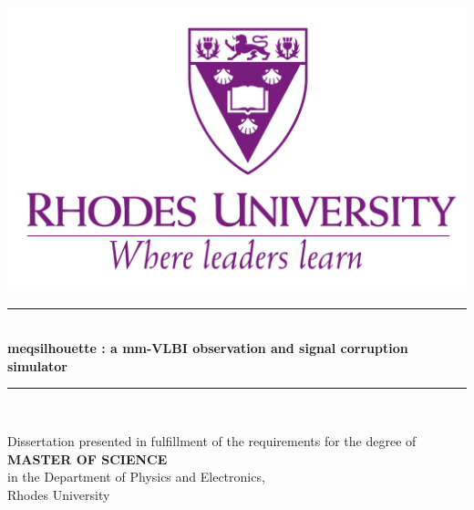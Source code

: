 \begin{titlepage}

\newcommand{\HRule}{\rule{\linewidth}{0.5mm}} %

\center %
 

\includegraphics[width=0.4\columnwidth]{Images/Rhode.png}\\[1cm] %



\HRule \\[0.4cm]
{ \huge \bfseries {\sc meqsilhouette} : a mm-VLBI observation and signal corruption simulator}\\[0.4cm]
\HRule \\[1.5cm]


\begin{center}
 {\large Dissertation presented in fulfillment of the requirements for the degree of} \\
 {\large \textbf{MASTER OF SCIENCE}} \\
 {\large in the Department of Physics and Electronics,} \\
 {\large Rhodes University}
\end{center}
\vspace{0.02\textheight}



\end{titlepage}
